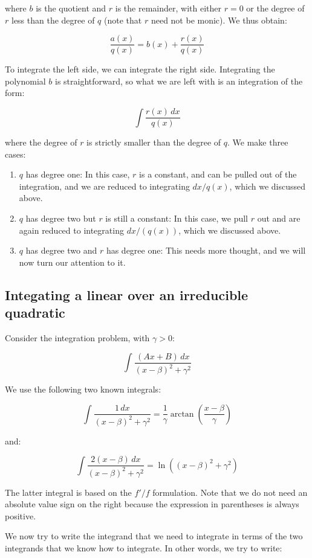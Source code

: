 \documentclass[10pt]{amsart}
\begin{document}
where $b$ is the quotient and $r$ is the remainder, with either $r =
0$ or the degree of $r$ less than the degree of $q$ (note that $r$
need not be monic). We thus obtain:

$$\frac{a(x)}{q(x)} = b(x) + \frac{r(x)}{q(x)}$$

To integrate the left side, we can integrate the right
side. Integrating the polynomial $b$ is straightforward, so what we are
left with is an integration of the form:

$$\int \frac{r(x) \, dx}{q(x)}$$

where the degree of $r$ is strictly smaller than the degree of $q$. We
make three cases:

\begin{enumerate}
\item $q$ has degree one: In this case, $r$ is a constant, and can be
  pulled out of the integration, and we are reduced to integrating
  $dx/q(x)$, which we discussed above.
\item $q$ has degree two but $r$ is still a constant: In this case, we
  pull $r$ out and are again reduced to integrating $dx/(q(x))$, which
  we discussed above.
\item $q$ has degree two and $r$ has degree one: This needs more
  thought, and we will now turn our attention to it.
\end{enumerate}

\subsection{Integating a linear over an irreducible quadratic}

Consider the integration problem, with $\gamma > 0$:

$$\int \frac{(Ax + B) \, dx}{(x - \beta)^2 + \gamma^2} $$

We use the following two known integrals:

$$\int \frac{1 \, dx}{(x - \beta)^2 + \gamma^2} = \frac{1}{\gamma} \arctan\left(\frac{x - \beta}{\gamma}\right)$$

and:

$$\int \frac{2(x - \beta) \, dx}{(x - \beta)^2 + \gamma^2} = \ln((x - \beta)^2 + \gamma^2)$$

The latter integral is based on the $f'/f$ formulation. Note that we
do not need an absolute value sign on the right because the expression
in parentheses is always positive.

We now try to write the integrand that we need to integrate in terms
of the two integrands that we know how to integrate. In other words,
we try to write:
\end{document}
